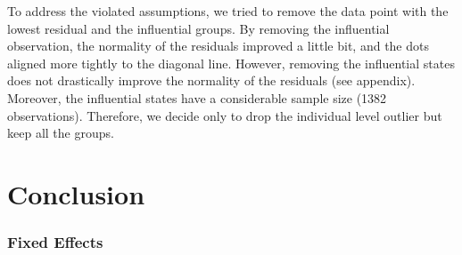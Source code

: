 \documentclass[
  11pt,
]{article}
\begin{document}
To address the violated assumptions, we tried to remove the data point
with the lowest residual and the influential groups. By removing the
influential observation, the normality of the residuals improved a
little bit, and the dots aligned more tightly to the diagonal line.
However, removing the influential states does not drastically improve
the normality of the residuals (see appendix). Moreover, the influential
states have a considerable sample size (1382 observations). Therefore,
we decide only to drop the individual level outlier but keep all the
groups.

\hypertarget{conclusion}{%
\section{Conclusion}\label{conclusion}}

\hypertarget{fixed-effects}{%
\subsubsection{Fixed Effects}\label{fixed-effects}}
\end{document}
